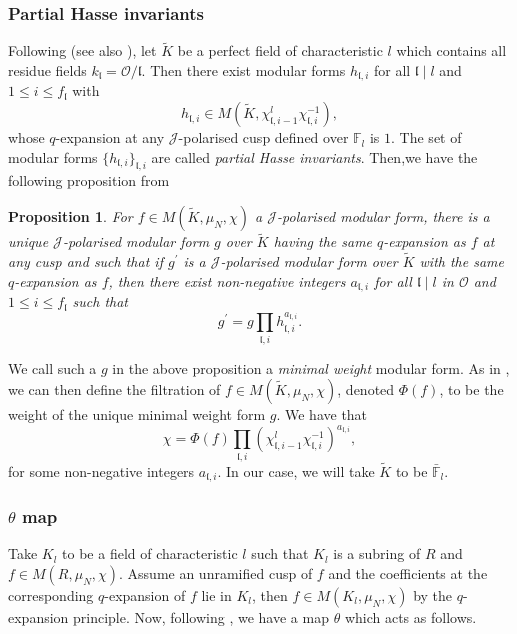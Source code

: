 \documentclass[a4paper,oneside]{amsart}
\theoremstyle{plain}
\newtheorem{prop}[thm]{Proposition}
\theoremstyle{definition}
\begin{document}
\subsubsection{Partial Hasse invariants}
\label{sec:Hasse}
Following \cite{goren2} (see also \cite[\S 7,8]{andreattagoren}), let $\tilde{K}$ be a perfect field of characteristic $l$ which contains all residue fields $k_\mathfrak{l} = \mathcal{O}/\mathfrak{l}$. Then there exist modular forms $h_{\mathfrak{l},i}$ for all $\mathfrak{l} \mid l$ and $1 \leq i \leq f_{\mathfrak{l}}$ with
\begin{equation*}
    h_{\mathfrak{l},i} \in M(\tilde{K}, \chi_{\mathfrak{l},i-1}^l\chi_{\mathfrak{l},i}^{-1}),
\end{equation*}
whose $q$-expansion at any $\mathcal{J}$-polarised cusp defined over $\mathbb{F}_l$ is $1$. The set of modular forms $\{h_{\mathfrak{l},i}\}_{\mathfrak{l},i}$ are called \emph{partial Hasse invariants}. Then,we have the following proposition from \cite[Prop. 8.19]{andreattagoren}
\begin{prop}
    For $f \in M(\tilde{K}, \mu_N, \chi)$ a $\mathcal{J}$-polarised modular form, there is a unique $\mathcal{J}$-polarised modular form $g$ over $\tilde{K}$ having the same $q$-expansion as $f$ at any cusp and such that if $g^\prime$ is a $\mathcal{J}$-polarised modular form over $\tilde{K}$ with the same $q$-expansion as $f$, then there exist non-negative integers $a_{\mathfrak{l},i}$ for all $\mathfrak{l} \mid l$ in $\mathcal{O}$ and $1\leq i \leq f_{\mathfrak{l}}$ such that
    \begin{equation*}
        g^\prime = g \prod_{\mathfrak{l},i} h_{\mathfrak{l},i}^{a_{\mathfrak{l},i}}.
    \end{equation*}
\end{prop}
We call such a $g$ in the above proposition a \emph{minimal weight} modular form. As in \cite[\S 8]{andreattagoren}, we can then define the filtration of $f \in M(\tilde{K}, \mu_N, \chi)$, denoted $\Phi(f)$, to be the weight of the unique minimal weight form $g$. We have that
\begin{equation*}
    \chi = \Phi(f) \prod_{\mathfrak{l},i} (\chi_{\mathfrak{l},{i-1}}^l\chi_{\mathfrak{l},i}^{-1})^{a_{\mathfrak{l},i}},
\end{equation*}
for some non-negative integers $a_{\mathfrak{l},i}$. In our case, we will take $\tilde{K}$ to be $\bar{\mathbb{F}}_l$. 
\subsubsection{$\theta$ map}
Take $K_l$ to be a field of characteristic $l$ such that $K_l$ is a subring of $R$ and $f \in M(R, \mu_{N}, \chi)$. Assume an unramified cusp of $f$ and the coefficients at the corresponding $q$-expansion of $f$ lie in $K_l$, then $f \in M(K_l, \mu_N, \chi)$ by the $q$-expansion principle. Now, following \cite[\S 15]{andreattagoren}, we have a map $\theta$ which acts as follows.
\end{document}
